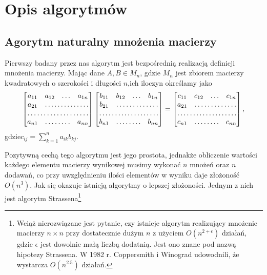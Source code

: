 \section{Opis algorytmów}
\subsection{Agorytm naturalny mnożenia macierzy}
Pierwszy badany przez nas algorytm jest bezpośrednią realizacją definicji
mnożenia macierzy. Mając dane $A,B \in M_{n}$, gdzie $M_{n}$ jest zbiorem
macierzy kwadratowych o szerokości i długości $n$,ich iloczyn określamy jako
$$ \begin{bmatrix}
a_{11} & a_{12} & \ldots & a_{1n} \\
a_{21} & \hdotsfor{3} \\
\hdotsfor{4}\\
a_{n1} & \hdotsfor{2} & a_{nn} \end{bmatrix}
\begin{bmatrix}
b_{11} & b_{12} & \ldots & b_{1n} \\
b_{21} & \hdotsfor{3} \\
\hdotsfor{4}\\
b_{n1} & \hdotsfor{2} & b_{nn} \end{bmatrix}=
\begin{bmatrix}
c_{11} & c_{12} & \ldots & c_{1n} \\
a_{21} & \hdotsfor{3} \\
\hdotsfor{4}\\
c_{n1} & \hdotsfor{2} & c_{nn} \end{bmatrix},
$$
gdzie$c_{ij}=\sum_{k=1}^{n} a_{ik}b_{kj}$. 

Pozytywną cechą tego algorytmu jest jego prostota, jednakże obliczenie wartości
każdego elementu macierzy wynikowej musimy wykonać $n$ mnożeń oraz $n$ dodawań,
co przy uwzględnieniu ilości elementów w wyniku daje złożoność $O(n^3)$.
Jak się okazuje istnieją algorytmy o lepszej złożoności. Jednym z nich jest
algorytm Strassena\footnote{Wciąż nierozwiązane jest pytanie, czy istnieje
algorytm realizujący mnożenie macierzy $n \times n$ przy dostatecznie dużym
$n$ z użyciem $O(n^{2+\epsilon})$ działań, gdzie $\epsilon$ jest dowolnie
małą liczbą dodatnią. Jest ono znane pod nazwą hipotezy Strassena.
W 1982 r. Coppersmith i Winograd udowodnili, że wystarcza $O(n^{2.5})$
działań.}
